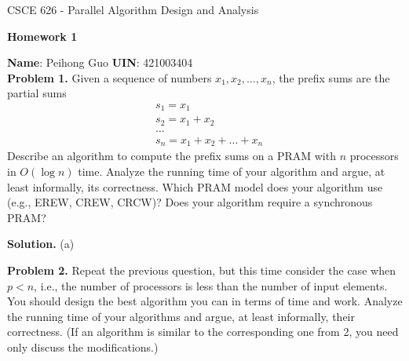\documentclass{article}
\theoremstyle{definition}
\newenvironment{problem}[1]{\noindent\textbf{Problem #1.}}{\\}
\newenvironment{solution}{\noindent\textbf{Solution.}}{}
\newenvironment{solutionitem}[1]{#1}{\bigbreak}
\newcommand{\name}[1]{\noindent\textbf{Name}: #1}
\newcommand{\uin}[1]{\noindent\textbf{UIN}: #1\\}
\newcommand{\problemset}[1]{\begin{center}\textbf{Homework #1}\end{center}}
\begin{document}
\begin{center}
{\large
CSCE 626 - Parallel Algorithm Design and Analysis}
\end{center}
\problemset{1}
\name{ Peihong Guo }
\uin{421003404}
\begin{problem}{1}  Given a sequence of numbers $x_1, x_2, \ldots, x_n$, the prefix sums are the partial sums
\[
\begin{split}
& s_1 = x_1 \\
& s_2 = x_1 + x_2 \\
& \ldots \\
& s_n = x_1 + x_2 + ... + x_n
\end{split}
\]
Describe an algorithm to compute the prefix sums on a PRAM with $n$
processors in $O(\log n)$ time. Analyze the running time of your
algorithm and argue, at least informally, its correctness.
Which PRAM model does your algorithm use (e.g., EREW, CREW, CRCW)?
Does your algorithm require a synchronous PRAM?
\end{problem}

\begin{solution}
\begin{solutionitem}{(a)}
\end{solutionitem}
\end{solution}

\begin{problem}{2} Repeat the previous question, but this time consider
  the case when $p < n$, i.e., the number of processors is less than
  the number of input elements. You should design the best algorithm
  you can in terms of time and work. Analyze the running time of your
  algorithms and argue, at least informally, their correctness.
  (If an algorithm is similar to the corresponding one from 2, you need only discuss the modifications.)
\end{problem}


\goodbreak
\end{document}
